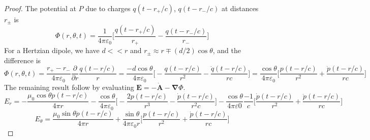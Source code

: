 \documentclass[a4paper]{article}
\theoremstyle{new}
\begin{document}
\begin{proof}
The potential at $P$ due to charges $q(t-r_+/c)$, $q(t-r_-/c)$ at distances $r_\pm$ is
$$\Phi(r,\theta,t)=\frac{1}{4\pi\varepsilon_0}\bigg[\frac{q(t-r_+/c)}{r_+}-\frac{q(t-r_-/c)}{r_-}\bigg]$$
For a Hertzian dipole, we have $d<<r$ and $r_\pm\approx r\mp (d/2)\cos\theta$, and the difference is
$$\Phi(r,\theta,t)=\frac{r_+-r_-}{4\pi\varepsilon_0}\frac{\partial}{\partial r}\frac{q(t-r/c)}{r}=\frac{-d\cos\theta}{4\pi\varepsilon_0}\bigg[-\frac{q(t-r/c)}{r^2}-\frac{\dot{q}(t-r/c)}{rc}\bigg]=\frac{\cos\theta}{4\pi\varepsilon_0}\bigg[\frac{p(t-r/c)}{r^2}+\frac{\dot{p}(t-r/c)}{rc}\bigg]$$
The remaining result follow by evaluating $\mathbf{E}=-\dot{\mathbf{A}}-\boldsymbol{\nabla}\Phi$.
$$E_r=-\frac{\mu_0\cos\theta\ddot{p}(t-r/c)}{4\pi r}-\frac{\cos\theta}{4\pi\varepsilon_0}\bigg[-\frac{2p(t-r/c)}{r^3}-\frac{\dot{p}(t-r/c)}{r^2c}\bigg]-\frac{\cos\theta}{4\pi\varepsilon0}\frac{-1}{c}\bigg[\frac{\dot{p}(t-r/c)}{r^2}+\frac{\ddot{p}(t-r/c)}{rc}\bigg]$$
$$E_\theta=\frac{\mu_0\sin\theta\ddot{p}(t-r/c)}{4\pi r}+\frac{\sin\theta}{4\pi\varepsilon_0 r}\bigg[\frac{p(t-r/c)}{r^2}+\frac{\dot{p}(t-r/c)}{rc}\bigg]$$
\end{proof}
\end{document}
